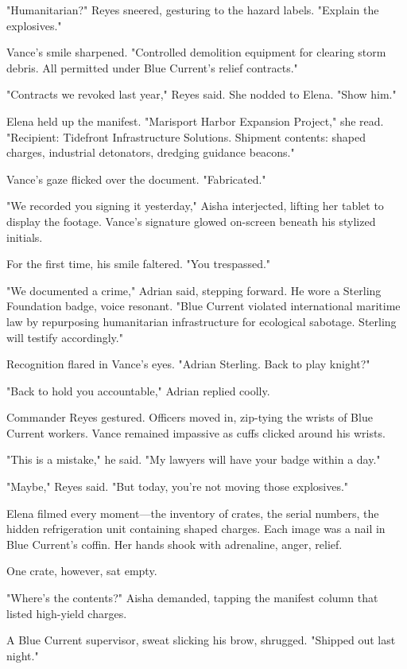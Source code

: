 "Humanitarian?" Reyes sneered, gesturing to the hazard labels. "Explain the explosives."

Vance's smile sharpened. "Controlled demolition equipment for clearing storm debris. All permitted under Blue Current's relief contracts."

"Contracts we revoked last year," Reyes said. She nodded to Elena. "Show him."

Elena held up the manifest. "Marisport Harbor Expansion Project," she read. "Recipient: Tidefront Infrastructure Solutions. Shipment contents: shaped charges, industrial detonators, dredging guidance beacons."

Vance's gaze flicked over the document. "Fabricated."

"We recorded you signing it yesterday," Aisha interjected, lifting her tablet to display the footage. Vance's signature glowed on-screen beneath his stylized initials.

For the first time, his smile faltered. "You trespassed."

"We documented a crime," Adrian said, stepping forward. He wore a Sterling Foundation badge, voice resonant. "Blue Current violated international maritime law by repurposing humanitarian infrastructure for ecological sabotage. Sterling will testify accordingly."

Recognition flared in Vance's eyes. "Adrian Sterling. Back to play knight?"

"Back to hold you accountable," Adrian replied coolly.

Commander Reyes gestured. Officers moved in, zip-tying the wrists of Blue Current workers. Vance remained impassive as cuffs clicked around his wrists.

"This is a mistake," he said. "My lawyers will have your badge within a day."

"Maybe," Reyes said. "But today, you're not moving those explosives."

Elena filmed every moment—the inventory of crates, the serial numbers, the hidden refrigeration unit containing shaped charges. Each image was a nail in Blue Current's coffin. Her hands shook with adrenaline, anger, relief.

One crate, however, sat empty.

"Where's the contents?" Aisha demanded, tapping the manifest column that listed high-yield charges.

A Blue Current supervisor, sweat slicking his brow, shrugged. "Shipped out last night."

